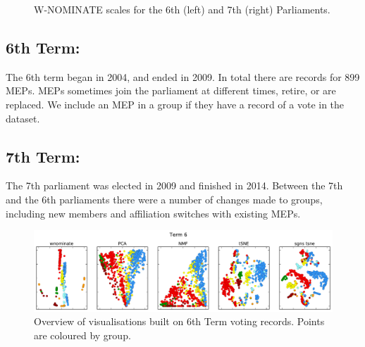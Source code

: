 \documentclass{llncs}
\begin{document}
\begin{figure}[!h]
\begin{minipage}{0.5\textwidth}
    \end{minipage}
    \caption{W-NOMINATE scales for the 6th (left) and 7th (right) Parliaments.}\label{fig:wn}
\end{figure}


\subsection{6th Term:}

The 6th term began in 2004, and ended in 2009. In total there are records for 899 MEPs. MEPs sometimes join the parliament at different times, retire, or are replaced. We include an MEP in a group if they have a record of a vote in the dataset.


\subsection{7th Term:}

The 7th parliament was elected in 2009 and finished in 2014. Between the 7th and the 6th parliaments there were a number of changes made to groups, including new members and affiliation switches with existing MEPs.



\begin{figure}[!h]
\includegraphics[width=\textwidth]{figures/term6.pdf}
\caption{Overview of visualisations built on 6th Term voting records. Points are coloured by group.}
\label{fig:allmethods6}
\end{figure}
\end{document}
